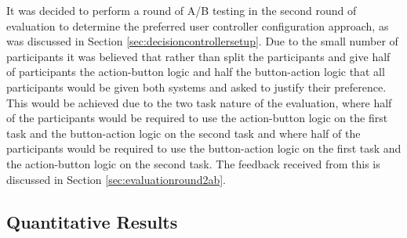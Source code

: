 \documentclass{l4proj}
\begin{document}
It was decided to perform a round of A/B testing in the second round of evaluation to determine the preferred user controller configuration approach, as was discussed in Section \ref{sec:decisioncontrollersetup}. Due to the small number of participants it was believed that rather than split the participants and give half of participants the action-button logic and half the button-action logic that all participants would be given both systems and asked to justify their preference. This would be achieved due to the two task nature of the evaluation, where half of the participants would be required to use the action-button logic on the first task and the button-action logic on the second task and where half of the participants would be required to use the button-action logic on the first task and the action-button logic on the second task. The feedback received from this is discussed in Section \ref{sec:evaluationround2ab}. 

\subsection{Quantitative Results}
\label{sec:evlauationquant2}
\end{document}
